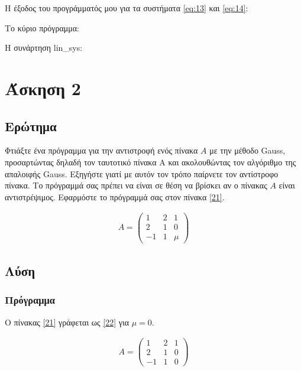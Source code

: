 \documentclass[12pt, fleqn, leqno]{extreport}
\begin{document}
Η έξοδος του προγράμματός μου για τα συστήματα \eqref{eq:13} και \eqref{eq:14}:


\newpage
Το κύριο πρόγραμμα:


\newpage
Η συνάρτηση lin\_sys:\label{lin_sys}


\chapter{Άσκηση 2}
\section{Ερώτημα}

Φτιάξτε ένα πρόγραμμα για την αντιστροφή ενός πίνακα $A$ με την μέθοδο Gauss, προσαρτώντας δηλαδή τον ταυτοτικό πίνακα Α και ακολουθώντας τον αλγόριθμο της απαλοιφής Gauss. Εξηγήστε γιατί με αυτόν τον τρόπο παίρνετε τον αντίστροφο πίνακα. Το πρόγραμμά σας πρέπει να είναι σε θέση να βρίσκει αν ο πίνακας $A$ είναι αντιστρέψιμος. Εφαρμόστε το πρόγραμμά σας στον πίνακα \eqref{21}.

\begin{equation}
    \begin{aligned}
        A = \begin{pmatrix}
            1  & 2 & 1   \\
            2  & 1 & 0   \\
            -1 & 1 & \mu
        \end{pmatrix}\label{21}
    \end{aligned}
\end{equation}


\newpage
\section{Λύση}

\subsection{Πρόγραμμα}

Ο πίνακας \eqref{21} γράφεται ως \eqref{22} για $\mu = 0$.

\begin{equation}
    \begin{aligned}
        A = \begin{pmatrix}
            1  & 2 & 1 \\
            2  & 1 & 0 \\
            -1 & 1 & 0
        \end{pmatrix}\label{22}
    \end{aligned}
\end{equation}
\end{document}
